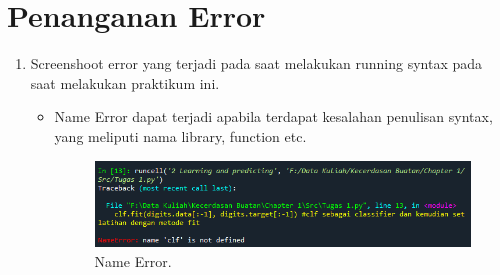 \section{Penanganan Error}
\begin{enumerate}
	\item Screenshoot error yang terjadi pada saat melakukan running syntax pada saat melakukan praktikum ini.
	\begin{itemize}
		\item Name Error dapat terjadi apabila terdapat kesalahan penulisan syntax, yang meliputi nama library, function etc.
		\hfill\break
		\begin{figure}[H]
			\includegraphics[width=10cm, height=3cm\textwidth]{figures/chapter1/error/error1.PNG}
			\centering
			\caption{Name Error.}
		\end{figure} \\ 


\end{itemize}
\end{enumerate}
